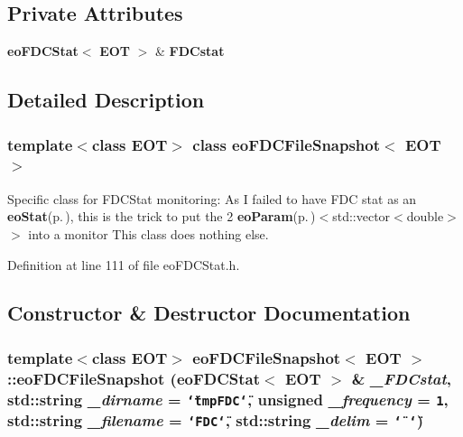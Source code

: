 \subsection*{Private Attributes}
\begin{CompactItemize}
\item 
{\bf eo\-FDCStat}$<$ {\bf EOT} $>$ \& {\bf FDCstat}\label{classeo_f_d_c_file_snapshot_r0}

\end{CompactItemize}


\subsection{Detailed Description}
\subsubsection*{template$<$class EOT$>$ class eo\-FDCFile\-Snapshot$<$ EOT $>$}

Specific class for FDCStat monitoring: As I failed to have FDC stat as an {\bf eo\-Stat}{\rm (p.\,\pageref{classeo_stat})}, this is the trick to put the 2 {\bf eo\-Param}{\rm (p.\,\pageref{classeo_param})}$<$std::vector$<$double$>$ $>$ into a monitor This class does nothing else. 



Definition at line 111 of file eo\-FDCStat.h.

\subsection{Constructor \& Destructor Documentation}
\subsubsection{\setlength{\rightskip}{0pt plus 5cm}template$<$class EOT$>$ {\bf eo\-FDCFile\-Snapshot}$<$ {\bf EOT} $>$::{\bf eo\-FDCFile\-Snapshot} ({\bf eo\-FDCStat}$<$ {\bf EOT} $>$ \& {\em \_\-FDCstat}, std::string {\em \_\-dirname} = {\tt \char`\"{}tmpFDC\char`\"{}}, unsigned {\em \_\-frequency} = {\tt 1}, std::string {\em \_\-filename} = {\tt \char`\"{}FDC\char`\"{}}, std::string {\em \_\-delim} = {\tt \char`\"{}\ \char`\"{}})\hspace{0.3cm}{\tt  [inline]}}\label{classeo_f_d_c_file_snapshot_a0}


